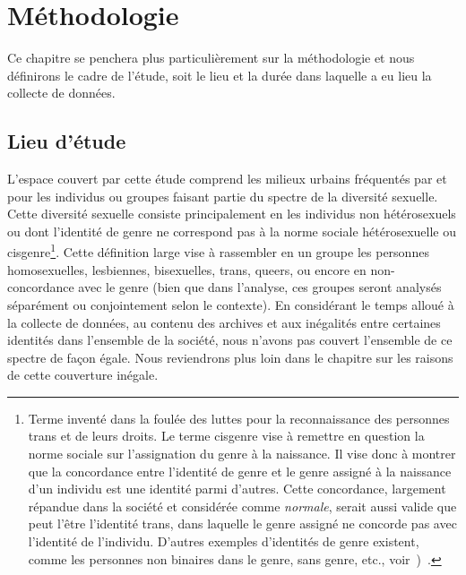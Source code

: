\chapter{Méthodologie}
\label{cha:methodologie}


Ce chapitre se penchera plus particulièrement sur la méthodologie et nous définirons le cadre de l'étude, soit le lieu et la durée dans laquelle a eu lieu la collecte de données.

\section{Lieu d'étude}
\label{sec:lieu_d_tude}

L'espace couvert par cette étude comprend les milieux urbains fréquentés par et pour les individus ou groupes faisant partie du spectre de la diversité sexuelle.
Cette diversité sexuelle consiste principalement en les individus non hétérosexuels ou dont l'identité de genre ne correspond pas à la norme sociale hétérosexuelle ou cisgenre\footnote{Terme inventé dans la foulée des luttes pour la reconnaissance des personnes trans et de leurs droits.
  Le terme cisgenre vise à remettre en question la norme sociale sur l'assignation du genre à la naissance.
  Il vise donc à montrer que la concordance entre l'identité de genre et le genre assigné à la naissance d'un individu est une identité parmi d'autres.
  Cette concordance, largement répandue dans la société et considérée comme \emph{normale}, serait aussi valide que peut l'être l'identité trans, dans laquelle le genre assigné ne concorde pas avec l'identité de l'individu.
  D'autres exemples d'identités de genre existent, comme les personnes non binaires dans le genre, sans genre, etc., voir~\cite{Barker2015})~\citep[150]{McGeeney2015}.}.
Cette définition large vise à rassembler en un groupe les personnes homosexuelles, lesbiennes, bisexuelles, trans, queers, ou encore en non-concordance avec le genre (bien que dans l'analyse, ces groupes seront analysés séparément ou conjointement selon le contexte).
En considérant le temps alloué à la collecte de données, au contenu des archives et aux inégalités entre certaines identités dans l'ensemble de la société, nous n'avons pas couvert l'ensemble de ce spectre de façon égale.
Nous reviendrons plus loin dans le chapitre sur les raisons de cette couverture inégale.

